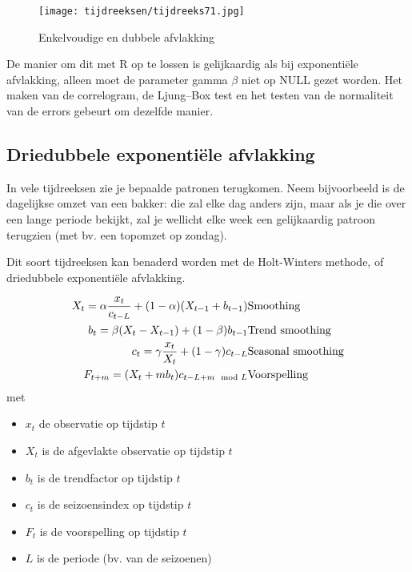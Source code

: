 \begin{figure}
	\centering
		\texttt{[image: tijdreeksen/tijdreeks71.jpg]}
	\caption{Enkelvoudige en dubbele afvlakking}
	\label{fig:tijdreeks71}
\end{figure}

De manier om dit met R op te lossen is gelijkaardig als bij exponentiële afvlakking, alleen moet de parameter gamma $\beta$ niet op NULL gezet worden. Het maken van de correlogram, de Ljung–Box test en het testen van de normaliteit van de errors gebeurt om dezelfde manier. 

\subsection{Driedubbele exponentiële afvlakking}

In vele tijdreeksen zie je bepaalde patronen terugkomen. Neem bijvoorbeeld is de dagelijkse omzet van een bakker: die zal elke dag anders zijn, maar als je die over een lange periode bekijkt, zal je wellicht elke week een gelijkaardig patroon terugzien (met bv. een topomzet op zondag).

Dit soort tijdreeksen kan benaderd worden met de Holt-Winters methode, of driedubbele exponentiële afvlakking.

\begin{eqnarray}
  X_{t} = \alpha \frac{x_{t}}{c_{t-L}} + (1-\alpha) (X_{t-1} + b_{t-1}) & \textnormal{Smoothing}\\
  b_{t} = \beta (X_{t} - X_{t-1}) + (1-\beta)b_{t-1} & \textnormal{Trend smoothing} \\
  c_{t} = \gamma \frac{x_{t}}{X_{t}} + (1-\gamma)c_{t-L} & \textnormal{Seasonal smoothing} \\
  F_{t+m} = (X_{t} + mb_{t})c_{t-L+m \mod L}  & \textnormal{Voorspelling}
  \label{eq:HoltWinters}
\end{eqnarray}
 met 
\begin{itemize}
	\item $x_{t}$ de observatie op tijdstip $t$
	\item $X_{t}$ is de afgevlakte observatie op tijdstip $t$
	\item $b_{t}$ is de trendfactor op tijdstip $t$
	\item $c_{t}$ is de seizoensindex op tijdstip $t$
	\item $F_{t}$ is de voorspelling op tijdstip $t$
	\item $L$ is de periode (bv. van de seizoenen)
\end{itemize}

